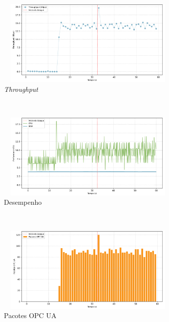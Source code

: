\begin{apendicesenv}
\begin{figure}[htbp!]
    \centering
    \caption{\label{fig:2-dos_certificate_inf_chain_loop}Gráficos do ataque de DoS por loop infinito na cadeia de certificados - nível de segurança: `Sign \& Encrypt'.}
    \begin{subfigure}[t]{0.5\textwidth}
        \centering
        \caption{\textit{Throughput}}
        \includegraphics[width=1\textwidth, height=120pt]{USPSC-img/output/cropped/2-dos_certificate_inf_chain_loop-tput.png}
    \end{subfigure}%
    ~ 
    \begin{subfigure}[t]{0.5\textwidth}
        \centering
        \caption{Desempenho}
        \includegraphics[width=1\textwidth, height=120pt]{USPSC-img/output/cropped/2-dos_certificate_inf_chain_loop-perf.png}
    \end{subfigure}%
    \\
    \begin{subfigure}[t]{0.5\textwidth}
        \centering
        \caption{Pacotes OPC UA}
        \includegraphics[width=1\textwidth, height=120pt]{USPSC-img/output/cropped/2-dos_certificate_inf_chain_loop-pack.png}
    \end{subfigure}%
    ~
    \begin{subfigure}[t]{0.5\textwidth}

\end{subfigure}
\end{figure}
\end{apendicesenv}
